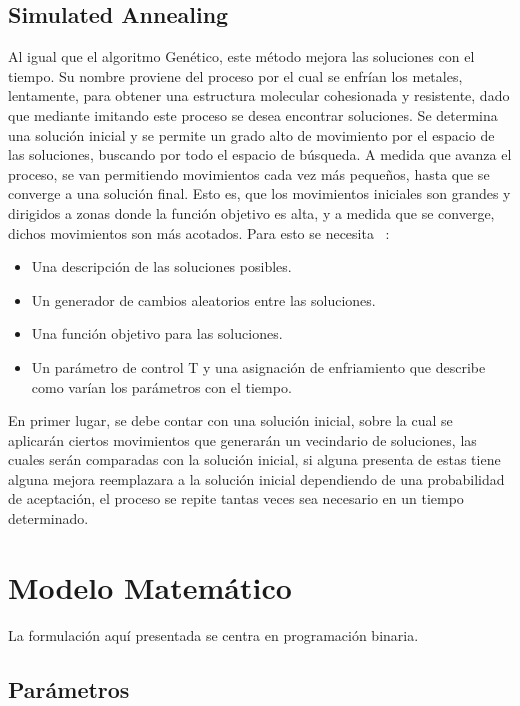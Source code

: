 \documentclass[letter, 10pt]{article}
\begin{document}
\subsection{Simulated Annealing}
Al igual que el algoritmo Gen\'etico, este m\'etodo mejora las soluciones con el tiempo. Su nombre proviene del proceso por el cual se enfr\'ian
los metales, lentamente, para obtener una estructura molecular cohesionada y resistente, dado que mediante imitando este proceso se desea encontrar
soluciones.
\newline
Se determina una soluci\'on inicial y se permite un grado alto de movimiento por el espacio de las soluciones, buscando por todo el espacio de 
b\'usqueda. A medida que avanza el proceso, se van permitiendo movimientos cada vez m\'as peque\~nos, hasta que se converge a una soluci\'on final. 
Esto es, que los movimientos iniciales son grandes y dirigidos a zonas donde la funci\'on objetivo es alta, y a medida que se converge, 
dichos movimientos son m\'as acotados.
Para esto se necesita ~\cite{whitepaper}:
\begin{itemize}
 \item Una descripci\'on de las soluciones posibles.
 \item Un generador de cambios aleatorios entre las soluciones.
 \item Una funci\'on objetivo para las soluciones.
 \item Un par\'ametro de control T y una asignaci\'on de enfriamiento que describe como var\'ian los par\'ametros con el tiempo.
\end{itemize}

En primer lugar, se debe contar con una soluci\'on inicial, sobre la cual se aplicar\'an ciertos movimientos que generar\'an un vecindario de soluciones, las cuales ser\'an comparadas con la soluci\'on inicial, si alguna presenta de estas tiene alguna mejora reemplazara a la soluci\'on inicial dependiendo de una probabilidad de aceptaci\'on, el proceso se repite tantas veces sea necesario en un tiempo determinado.

\newpage
\section{Modelo Matem\'atico}
La formulaci\'on aqu\'i presentada se centra en programaci\'on binaria.~\cite{RUTEO}

\subsection{Par\'ametros}
\end{document}

